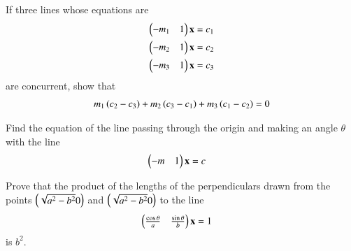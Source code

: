 %
\item If three lines whose equations are 
%
\begin{align}
\begin{pmatrix}-m_1 & 1\end{pmatrix}\mathbf{x} &= c_1
\\
\begin{pmatrix}-m_2 & 1\end{pmatrix}\mathbf{x} &= c_2
\\
\begin{pmatrix}-m_3 & 1\end{pmatrix}\mathbf{x} &= c_3
\end{align}
%
are concurrent, show that
%
\begin{align}
m_1\left(c_2-c_3\right)+
m_2\left(c_3-c_1\right)+
m_3\left(c_1-c_2\right) = 0
\end{align}
%
\item Find the equation of the line passing through the origin and making an angle $\theta$ with the line %
\begin{align}
\begin{pmatrix}-m & 1\end{pmatrix}\mathbf{x} &= c
\end{align}
%
\solution

\item Prove that the product of the lengths of the perpendiculars drawn from the points $\begin{pmatrix}\sqrt{a^2-b^2}0\end{pmatrix}$ and $\begin{pmatrix}\sqrt{a^2-b^2}0\end{pmatrix}$ to the line 
%
\begin{align}
\begin{pmatrix}\frac{\cos\theta}{a} & \frac{\sin\theta}{b}\end{pmatrix}\mathbf{x} &= 1
\end{align}
%
is $b^2$.

